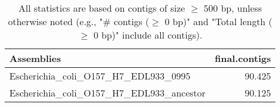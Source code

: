 \documentclass[12pt,a4paper]{article}
\begin{document}
\begin{table}[ht]
\begin{center}
\caption{All statistics are based on contigs of size $\geq$ 500 bp, unless otherwise noted (e.g., "\# contigs ($\geq$ 0 bp)" and "Total length ($\geq$ 0 bp)" include all contigs).}
\begin{tabular}{|l*{1}{|r}|}
\hline
Assemblies & final.contigs \\ \hline
Escherichia\_coli\_O157\_H7\_EDL933\_0995 & 90.425 \\ \hline
Escherichia\_coli\_O157\_H7\_EDL933\_ancestor & 90.125 \\ \hline
\end{tabular}
\end{center}
\end{table}
\end{document}
